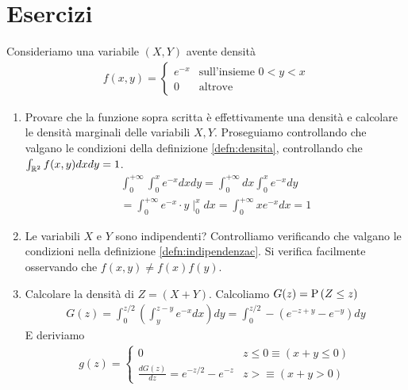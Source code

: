 \section{Esercizi}

\begin{exrc}
    Consideriamo una variabile $(X,Y)$ avente densità
    \begin{equation*}
        \begin{aligned}
            f(x,y) = \begin{cases}
                e^{-x} & \text{sull'insieme } 0 < y < x \\
                0 & \text{altrove}
            \end{cases}
        \end{aligned}
    \end{equation*}
    \begin{enumerate}
        \item Provare che la funzione sopra scritta è effettivamente una densità
        e calcolare le densità marginali delle variabili $X,Y$. Proseguiamo
        controllando che valgano le condizioni della definizione
        \ref{defn:densita}, controllando che $\int_{\mathbb{R}^2} f(x,y) dxdy = 1$.
        \begin{equation*}
            \begin{aligned}
                \int_0^{+\infty} \int_{0}^{x} e^{-x} dx dy = \int_{0}^{+\infty} dx \int_{0}^{x} e^{-x} dy \\
                = \int_{0}^{+\infty} e^{-x} \cdot y \mid_{0}^{x} dx = \int_{0}^{+\infty} xe^{-x} dx = 1
            \end{aligned}
        \end{equation*}
        \item Le variabili $X$ e $Y$ sono indipendenti? Controlliamo verificando
        che valgano le condizioni nella definizione \ref{defn:indipendenzac}. Si
        verifica facilmente osservando che $ f(x,y) \neq f(x)f(y) $.
        \item Calcolare la densità di $Z = (X + Y)$. Calcoliamo $G(z) = \text{P}\left(Z
        \leq z\right)$
        \begin{equation*}
            \begin{aligned}
                G(z) = \int_{0}^{z/2} \left( \int_{y}^{z-y} e^{-x} dx \right) dy = \int_{0}^{z/2} - \left( e^{-z+y} - e^{-y} \right) dy
            \end{aligned}
        \end{equation*}
        E deriviamo
        \begin{equation*}
            \begin{aligned}
                g(z) = \begin{cases}
                    0 & z \leq 0 \equiv (x + y \leq 0) \\
                    \frac{dG(z)}{dz} = e^{-z/2} - e^{-z} & z > \equiv (x+y > 0)
                \end{cases}
            \end{aligned}
        \end{equation*}
    \end{enumerate}
\end{exrc}

